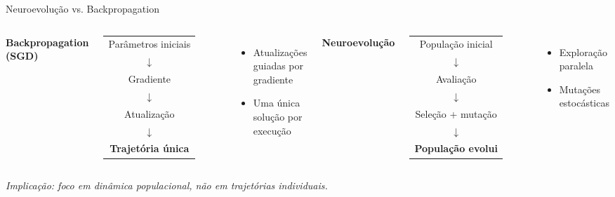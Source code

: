 \documentclass[aspectratio=169]{beamer}
\begin{document}
\begin{frame}{Neuroevolução vs. Backpropagation}

\begin{columns}[T,onlytextwidth]

\textbf{Backpropagation (SGD)}
\vspace{0.15cm}

\footnotesize
\begin{tabular}{c}
Parâmetros iniciais \\
$\downarrow$ \\
Gradiente \\
$\downarrow$ \\
Atualização \\
$\downarrow$ \\
\textbf{Trajetória única}
\end{tabular}

\vspace{0.2cm}
\begin{itemize}
  \item Atualizações guiadas por gradiente
  \item Uma única solução por execução
\end{itemize}

\textbf{Neuroevolução}
\vspace{0.15cm}

\footnotesize
\begin{tabular}{c}
População inicial \\
$\downarrow$ \\
Avaliação \\
$\downarrow$ \\
Seleção + mutação \\
$\downarrow$ \\
\textbf{População evolui}
\end{tabular}

\vspace{0.2cm}
\begin{itemize}
  \item Exploração paralela
  \item Mutações estocásticas
\end{itemize}

\end{columns}

\vspace{0.25cm}
\centering
\textit{Implicação: foco em dinâmica populacional, não em trajetórias individuais.}

\end{frame}
\end{document}
